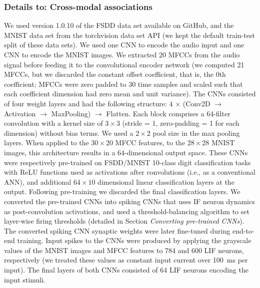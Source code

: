 \documentclass{article}
\begin{document}
\subsubsection*{Details to: Cross-modal associations}
We used version 1.0.10 of the FSDD data set available on GitHub, and the MNIST data set from the torchvision data set API (we kept the default train-test split of these data sets). We used one \gls{CNN} to encode the audio input and one \gls{CNN} to encode the MNIST images. We extracted \num{20} \glspl{MFCC} from the audio signal before feeding it to the convolutional encoder network (we computed \num{21} \glspl{MFCC}, but we discarded the constant offset coefficient, that is, the \num{0}th coefficient; \glspl{MFCC} were zero padded to \num{30} time samples and scaled such that each coefficient dimension had zero mean and unit variance).
The \glspl{CNN} consisted of four weight layers and had the following structure: $4$ $\times$ (Conv2D $\rightarrow$ Activation $\rightarrow$ MaxPooling) $\rightarrow$ Flatten. Each block comprises a \num{64}-filter convolution with a kernel size of $3 \times 3$ (stride = \num{1}, zero-padding = \num{1} for each dimension) without bias terms. We used a $2 \times 2$ pool size in the max pooling layers. 
When applied to the $30 \times 20$ \gls{MFCC} features, to the $28 \times 28$ MNIST images, this architecture results in a \num{64}-dimensional output space. 
These \glspl{CNN} were respectively pre-trained on FSDD/MNIST \num{10}-class digit classification tasks with ReLU functions used as activations after convolutions (i.e., as a conventional \gls{ANN}), and additional $64 \times 10$ dimensional linear classification layers at the output.
Following pre-training we discarded the final classification layers.
We converted the pre-trained \glspl{CNN} into spiking \glspl{CNN} that uses \gls{IF} neuron dynamics as post-convolution activations, and used a threshold-balancing algorithm to set layer-wise firing thresholds \cite{diehl2015fast,sengupta2019going} (detailed in Section \emph{Converting pre-trained CNNs}).
The converted spiking \gls{CNN} synaptic weights were later fine-tuned during end-to-end training.
Input spikes to the \glspl{CNN} were produced by applying the grayscale values of the MNIST images and \gls{MFCC} features to \num{784} and \num{600} \gls{LIF} neurons, respectively (we treated these values as constant input current over \SI{100}{\ms} per input).
The final layers of both \glspl{CNN} consisted of \num{64} \gls{LIF} neurons encoding the input stimuli.
\end{document}
